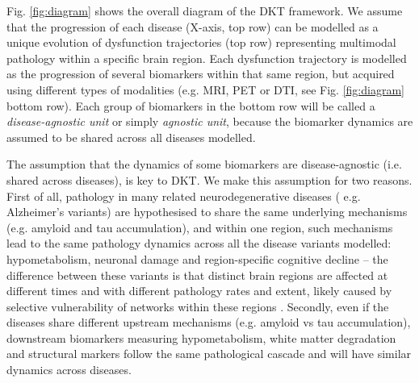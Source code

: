 \documentclass{llncs}
\begin{document}
Fig. \ref{fig:diagram} shows the overall diagram of the DKT framework. We assume that the progression of each disease (X-axis, top row) can be modelled as a unique evolution of dysfunction trajectories (top row) representing multimodal pathology within a specific brain region. Each dysfunction trajectory is modelled as the progression of several biomarkers within that same region, but acquired using different types of modalities (e.g. MRI, PET or DTI, see Fig. \ref{fig:diagram} bottom row). Each group of biomarkers in the bottom row will be called a \emph{disease-agnostic unit} or simply \emph{agnostic unit}, because the biomarker dynamics are assumed to be shared across all diseases modelled.

The assumption that the dynamics of some biomarkers are disease-agnostic (i.e. shared across diseases), is key to DKT. We make this assumption for two reasons. First of all, pathology in many related neurodegenerative diseases ( e.g. Alzheimer's variants) are hypothesised to share the same underlying mechanisms (e.g. amyloid and tau accumulation), and within one region, such mechanisms lead to the same pathology dynamics across all the disease variants modelled: hypometabolism, neuronal damage and region-specific cognitive decline \cite{jack2010hypothetical} -- the difference between these variants is that distinct brain regions are affected at different times and with different pathology rates and extent, likely caused by selective vulnerability of networks within these regions \cite{seeley2009neurodegenerative}. Secondly, even if the diseases share different upstream mechanisms (e.g. amyloid vs tau accumulation), downstream biomarkers measuring hypometabolism, white matter degradation and structural markers follow the same pathological cascade and will have similar dynamics across diseases.


\end{document}
